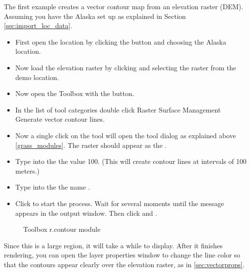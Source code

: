 The first example creates a vector contour map from an elevation raster
(DEM). Assuming you have the Alaska  set up as explained
in Section \ref{sec:import_loc_data}.

\begin{itemize}[label=--]
\item First open the location by clicking the
 button and choosing the Alaska
location.
\item Now load the  elevation raster by clicking
 and selecting the
 raster from the demo location.
\item Now open the Toolbox with the  button.
\item In the list of tool categories double click Raster \arrow Surface
Management \arrow Generate vector contour lines.
\item Now a single click on the tool  will open
the tool dialog as explained above \ref{grass_modules}. The
 raster should appear as the .
\item Type into the  the
value 100. (This will create contour lines at intervals of
100 meters.)
\item Type into the 
the name .
\item Click  to start the process. Wait for several moments until
the message  appears in the output window.
Then click  and .
\end{itemize}

\begin{figure}[ht]
\centering
    \hspace{0.5cm}
   \caption{\grass Toolbox r.contour module \nixcaption}\label{fig:grass_toolbox_rcontour}
\end{figure}

Since this is a large region, it will take a while to display. After it
finishes rendering, you can open the layer properties window to change the
line color so that the contours appear clearly over the elevation raster, as
in \ref{sec:vectorprops}.

